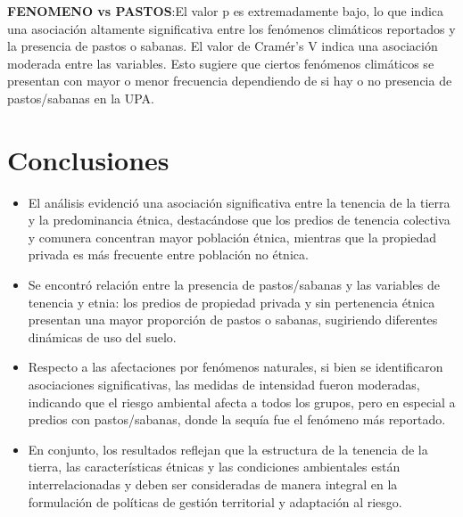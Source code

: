 \documentclass[]{tufte-handout}
\begin{document}
\textbf{FENOMENO vs PASTOS}:El valor p es extremadamente bajo, lo que
indica una asociación altamente significativa entre los fenómenos
climáticos reportados y la presencia de pastos o sabanas. El valor de
Cramér's V indica una asociación moderada entre las variables. Esto
sugiere que ciertos fenómenos climáticos se presentan con mayor o menor
frecuencia dependiendo de si hay o no presencia de pastos/sabanas en la
UPA.

\section{Conclusiones}\label{conclusiones}

\begin{itemize}
\item
  El análisis evidenció una asociación significativa entre la tenencia
  de la tierra y la predominancia étnica, destacándose que los predios
  de tenencia colectiva y comunera concentran mayor población étnica,
  mientras que la propiedad privada es más frecuente entre población no
  étnica.
\item
  Se encontró relación entre la presencia de pastos/sabanas y las
  variables de tenencia y etnia: los predios de propiedad privada y sin
  pertenencia étnica presentan una mayor proporción de pastos o sabanas,
  sugiriendo diferentes dinámicas de uso del suelo.
\item
  Respecto a las afectaciones por fenómenos naturales, si bien se
  identificaron asociaciones significativas, las medidas de intensidad
  fueron moderadas, indicando que el riesgo ambiental afecta a todos los
  grupos, pero en especial a predios con pastos/sabanas, donde la sequía
  fue el fenómeno más reportado.
\item
  En conjunto, los resultados reflejan que la estructura de la tenencia
  de la tierra, las características étnicas y las condiciones
  ambientales están interrelacionadas y deben ser consideradas de manera
  integral en la formulación de políticas de gestión territorial y
  adaptación al riesgo.
\end{itemize}


\end{document}
